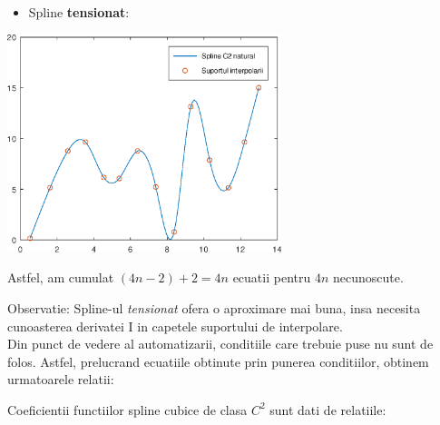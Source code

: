 \documentclass{article}
\begin{document}
\begin{itemize}
\begin{minipage}{0.5\textwidth}
\begin{itemize}
            \item Spline \textbf{tensionat}:
        \end{itemize}
    \end{minipage}
    \begin{minipage}{0.6\textwidth}
        \includegraphics[width=0.6\textwidth]{spline_c2_nat}
    \end{minipage}

\end{itemize}

Astfel, am cumulat $(4n-2) + 2 = 4n$ ecuatii pentru $4n$ necunoscute.

Observatie: Spline-ul \textit{tensionat} ofera o aproximare mai buna, insa necesita cunoasterea derivatei I in capetele suportului de interpolare.\\

Din punct de vedere al automatizarii, conditiile care trebuie puse nu sunt de folos. Astfel, prelucrand ecuatiile obtinute prin punerea conditiilor, obtinem urmatoarele relatii:

Coeficientii functiilor spline cubice de clasa $C^2$ sunt dati de relatiile:

 \\

 \\

\\
\end{document}
